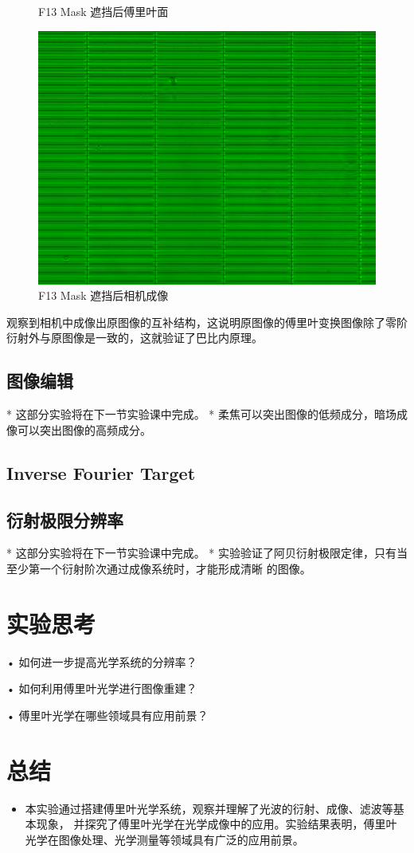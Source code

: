 \documentclass{ctexart}
\begin{document}
\begin{figure}[H]
\begin{minipage}[b]{0.2\textwidth}
    \caption{F13 Mask 遮挡后傅里叶面}
  \end{minipage}
  \begin{minipage}[b]{0.2\textwidth}
    \centering
    \includegraphics[width=\textwidth]{pictures/F13-mask-Ex24.png}
    \caption{F13 Mask 遮挡后相机成像}
  \end{minipage}
\end{figure}

观察到相机中成像出原图像的互补结构，这说明原图像的傅里叶变换图像除了零阶衍射外与原图像是一致的，这就验证了巴比内原理。

\subsection{图像编辑}
* 这部分实验将在下一节实验课中完成。
* 柔焦可以突出图像的低频成分，暗场成像可以突出图像的高频成分。
\subsection{Inverse Fourier Target}
\subsection{衍射极限分辨率}
* 这部分实验将在下一节实验课中完成。
* 实验验证了阿贝衍射极限定律，只有当至少第一个衍射阶次通过成像系统时，才能形成清晰
的图像。


\section{实验思考}
• 如何进一步提高光学系统的分辨率？

• 如何利用傅里叶光学进行图像重建？

• 傅里叶光学在哪些领域具有应用前景？

\section{总结}
\begin{itemize}
  \item 本实验通过搭建傅里叶光学系统，观察并理解了光波的衍射、成像、滤波等基本现象，
  并探究了傅里叶光学在光学成像中的应用。实验结果表明，傅里叶光学在图像处理、光学测量等领域具有广泛的应用前景。

\end{itemize}
\end{document}
